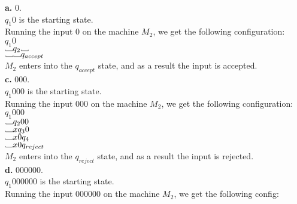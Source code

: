 \documentclass[12pt]{article}
\newcommand\Vtextvisiblespace[1][.8em]{%
	\mbox{\kern.07em\vrule height.3ex}%
	\vbox{\hrule width#1}%
	\hbox{\vrule height.3ex}}
\begin{document}
\textbf{a.} 0. \\

$q_1 0$ is the starting state. \\
Running the input 0 on the machine $M_2$, we get the following configuration: \\

$q_1 0$ \\
$\Vtextvisiblespace q_2 \Vtextvisiblespace$ \\
$\Vtextvisiblespace  \Vtextvisiblespace q_{accept}$  \\
$M_2$ enters into the $q_{accept}$ state, and as a result the input is accepted. \\

\textbf{c.} 000. \\
$q_1 000$ is the starting state. \\
Running the input 000 on the machine $M_2$, we get the following configuration: \\

$q_1 000$ \\
$\Vtextvisiblespace q_2 00$ \\
$\Vtextvisiblespace x q_3 0$ \\
$\Vtextvisiblespace x0 q_4 $ \\
$\Vtextvisiblespace x0 q_{reject} $ \\
$M_2$ enters into the $q_{reject}$ state, and as a result the input is rejected. \\

\pagebreak
\textbf{d.} 000000. \\
$q_1 000000$ is the starting state. \\
Running the input 000000 on the machine $M_2$, we get the following config: \\
\end{document}
